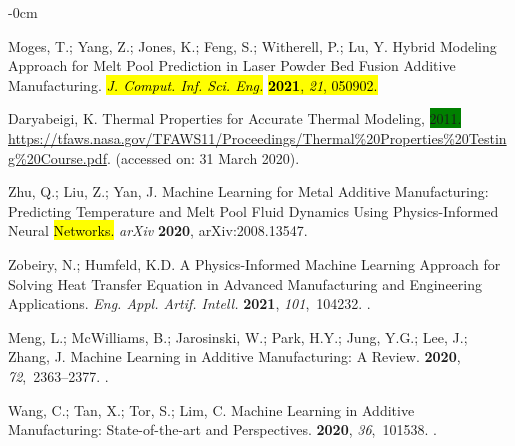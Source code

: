\documentclass[metals,article,accept,pdftex,moreauthors]{Definitions/mdpi}
\begin{document}
\begin{adjustwidth}{-\extralength}{0cm}
\begin{thebibliography}{999}
Moges, T.; Yang, Z.; Jones, K.; Feng, S.; Witherell, P.; Lu, Y.
Hybrid Modeling Approach for Melt Pool Prediction in Laser Powder Bed Fusion Additive Manufacturing.
\emph{\hl{J. Comput. Inf. Sci. Eng.}}
{\bf \hl{2021}}\hl{, \emph{21}, 050902.}

Daryabeigi, K.
Thermal {{Properties}} for {{Accurate Thermal Modeling}},  \colorbox{green}{2011.} %
{\url{https://tfaws.nasa.gov/TFAWS11/Proceedings/Thermal%20Properties%20Testing%20Course.pdf}}.
({accessed on: 31 March 2020}).

Zhu, Q.; Liu, Z.; Yan, J.
Machine Learning for Metal Additive Manufacturing: {{Predicting}} Temperature and Melt Pool Fluid Dynamics Using Physics-Informed Neural \hl{Networks.}
{\em arXiv} {\bf 2020}, arXiv:2008.13547.


Zobeiry, N.; Humfeld, K.D.
A Physics-Informed Machine Learning Approach for Solving Heat
  Transfer Equation in Advanced Manufacturing and Engineering Applications.
{\em Eng. Appl. Artif. Intell.} {\bf 2021},
  {\em 101},~104232.
.

Meng, L.; McWilliams, B.; Jarosinski, W.; Park, H.Y.; Jung, Y.G.; Lee, J.;
  Zhang, J.
\newblock Machine {{Learning}} in {{Additive Manufacturing}}: {{A Review}}.
 {\bf 2020}, {\em 72},~2363--2377.
.

Wang, C.; Tan, X.; Tor, S.; Lim, C.
\newblock Machine Learning in Additive Manufacturing: {{State-of-the-art}} and
  Perspectives.
 {\bf 2020}, {\em 36},~101538.
.


\end{thebibliography}
\end{adjustwidth}
\end{document}
